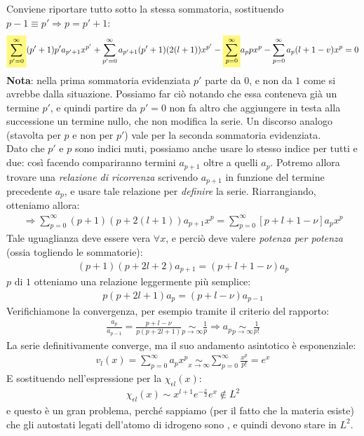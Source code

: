 \documentclass[../../FisicaTeorica.tex]{subfiles}
\begin{document}
Conviene riportare tutto sotto la stessa sommatoria, sostituendo \hbox{$p-1 \equiv p'\Rightarrow p=p'+1$}:
\begin{align*}
\hlc{Yellow}{\sum_{p'={0}}^\infty} (p'+1)p' a_{p'+1} x^{p'} + \sum_{p'=0}^\infty a_{p'+1} (p'+1) (2(l+1))x^{p'} - \hlc{Yellow}{\sum_{p=0}^\infty} a_p p x^p - \sum_{p=0}^\infty a_p(l+1-v)x^p=0
\end{align*}
\textbf{Nota}: nella prima sommatoria evidenziata $p'$ parte da $0$, e non da $1$ come si avrebbe dalla situazione. Possiamo far ciò notando che essa conteneva già un termine $p'$, e quindi partire da $p'=0$ non fa altro che aggiungere in testa alla successione un termine nullo, che non modifica la serie. Un discorso analogo (stavolta per $p$ e non per $p'$) vale per la seconda sommatoria evidenziata.\\

Dato che $p'$ e $p$ sono indici muti, possiamo anche usare lo stesso indice per tutti e due: così facendo compariranno termini $a_{p+1}$ oltre a quelli $a_p$. Potremo allora trovare una \textit{relazione di ricorrenza} scrivendo $a_{p+1}$ in funzione del termine precedente $a_p$, e usare tale relazione per \textit{definire} la serie. Riarrangiando, otteniamo allora:
\begin{align*}
\Rightarrow  \sum_{p=0}^\infty  (p+1)(p + 2(l+1)) a_{p+1}   x^{p} = \sum_{p=0}^\infty [p+ l+1-\nu]a_p x^p
\end{align*}
Tale uguaglianza deve essere vera $\forall x$, e perciò deve valere \textit{potenza per potenza} (ossia togliendo le sommatorie):
\begin{align}
(p+1)(p+2l+2)a_{p+1} = (p+l+1-\nu)a_p
\label{eqn:relazione_ricorrenza}
\end{align}
 $p$ di $1$ otteniamo una relazione leggermente più semplice:
\begin{align}
p(p+2l+1)a_{p} = (p+l-\nu)a_{p-1}
\label{eqn:ricorsione-semplificata}
\end{align}
Verifichiamone la convergenza, per esempio tramite il criterio del rapporto:
\begin{align*}
\frac{a_p}{a_{p-1}} = \frac{p+l-\nu}{p(p+2l+1)} \underset{p\to \infty}{\sim} \frac{1}{p} \Rightarrow a_p \underset{p \to \infty}{\sim}\frac{1}{p!}
\end{align*}
La serie definitivamente converge, ma il suo andamento asintotico è esponenziale:
\begin{align*}
v_l(x) = \sum_{p=0}^\infty a_p x^p \underset{x\to\infty}{\sim} \sum_{p=0}^\infty \frac{x^p}{p!} = e^x
\end{align*}
E sostituendo nell'espressione per la $\chi_{\epsilon l}(x)$:
\begin{align*}
\chi_{\epsilon l}(x) \sim x^{l+1} e^{-\frac{x}{2}} e^x \notin L^2
\end{align*}
e questo è un gran problema, perché sappiamo (per il fatto che la materia esiste) che gli autostati legati dell'atomo di idrogeno sono , e quindi devono stare in $L^2$.\\
\end{document}
